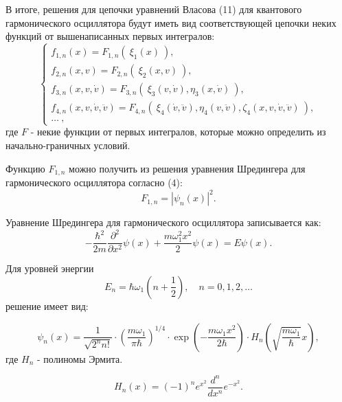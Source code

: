\documentclass[a4paper,14pt]{article}
\begin{document}
В итоге, решения для цепочки уравнений Власова (11) для квантового гармонического осциллятора будут иметь вид соответствующей цепочки неких функций от вышенаписанных первых интегралов:
\begin{equation}
\begin{cases}
{f_{1, n}(x)=F_{1, n}\left(~\xi_{1}(x)~\right)}, \\
{f_{2, n}(x, v)=F_{2, n}\left(~\xi_{2}(x, v)~\right)}, \\
{f_{3, n}(x, v, \dot{v})=F_{3, n}\left(~\xi_{3}(v, \dot{v}), \eta_{3}(x, \dot{v})~\right)}, \\
{f_{4, n}(x, v, \dot{v}, \ddot{v})=F_{4, n}\left(~\xi_{4}(\dot{v}, \ddot{v}), \eta_{4}(v, \ddot{v}), \zeta_{4}(x, v, \dot{v}, \ddot{v})~\right) }, \\
{\ldots}~,
\end{cases}
\end{equation}
где $F$ - некие функции от первых интегралов, которые можно определить из начально-граничных условий. 

Функцию $F_{1,n}$ можно получить из решения уравнения Шредингера для гармонического осциллятора согласно (4):
\begin{equation}
F_{1,n}=|\psi_n(x)|^2.
\end{equation}

Уравнение Шредингера для гармонического осциллятора записывается как:
\begin{equation}
-\frac{\hbar^{2}}{2 m} \frac{\partial^{2}}{\partial x^{2}} \psi(x)+\frac{m \omega_1^{2} x^{2}}{2} \psi(x)=E \psi(x).
\end{equation}

Для уровней энергии
\begin{equation}
E_{n}=\hbar \omega_1\left(n+\frac{1}{2}\right), \quad n=0,1,2, \ldots
\end{equation}
решение имеет вид:

\begin{equation}
\psi_{n}(x)=\frac{1}{\sqrt{2^{n} n !}} \cdot\left(\frac{m \omega_1}{\pi \hbar}\right)^{1 / 4} \cdot \exp \left(-\frac{m \omega_1 x^{2}}{2 \hbar}\right) \cdot H_{n}\left(\sqrt{\frac{m \omega_1}{\hbar}} x\right),
\end{equation}
где $H_n$ - полиномы Эрмита.

\begin{equation}
H_{n}(x)=(-1)^{n} e^{x^{2}} \frac{d^{n}}{d x^{n}} e^{-x^{2}}.
\end{equation}
\end{document}
